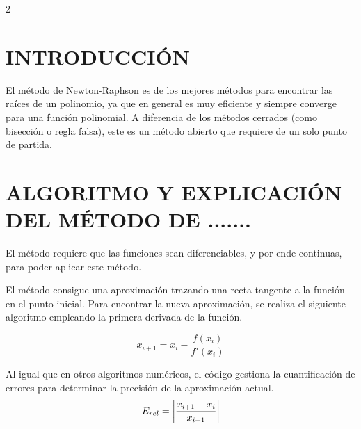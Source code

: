 \documentclass{rmf-d}
\begin{document}
\begin{multicols}{2}

\section{INTRODUCCIÓN}
\label{sec:1}
El método de Newton-Raphson es de los mejores métodos para encontrar las raíces de un polinomio, ya que en general es muy eficiente y siempre converge para una función polinomial. A diferencia de los métodos cerrados (como bisección o regla falsa), este es un método abierto que requiere de un solo punto de partida.
































\section{ALGORITMO Y EXPLICACIÓN DEL
MÉTODO DE .......}
\label{sec:2}
El método requiere que las funciones sean diferenciables, y por ende continuas, para poder aplicar este método.

El método consigue una aproximación trazando una recta tangente a la función en el punto inicial. Para encontrar la nueva aproximación, se realiza el siguiente algoritmo empleando la primera derivada de la función.

\begin{equation}
    x_{i+1}=x_i-\frac{f(x_i)}{f'(x_i)}
\end{equation}

Al igual que en otros algoritmos numéricos, el código gestiona la cuantificación de errores para determinar la precisión de la aproximación actual.
\begin{equation}
    E_{rel}=\abs{\frac{x_{i+1}-x_i}{x_{i+1}}}
\end{equation}

































\end{multicols}
\end{document}
